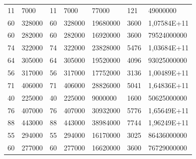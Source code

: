 \documentclass[a4paper]{scrreprt}
\begin{document}
\begin{enumerate}
\begin{table}
\begin{tiny}
\begin{tabular}{lllllll}
11                    & 7000                   & 11                  & 7000                & 77000                                       & 121                     & 49000000                \\
60                    & 328000                 & 60                  & 328000              & 19680000                                    & 3600                    & 1,07584E+11             \\
60                    & 282000                 & 60                  & 282000              & 16920000                                    & 3600                    & 79524000000             \\
74                    & 322000                 & 74                  & 322000              & 23828000                                    & 5476                    & 1,03684E+11             \\
64                    & 305000                 & 64                  & 305000              & 19520000                                    & 4096                    & 93025000000             \\
56                    & 317000                 & 56                  & 317000              & 17752000                                    & 3136                    & 1,00489E+11             \\
71                    & 406000                 & 71                  & 406000              & 28826000                                    & 5041                    & 1,64836E+11             \\
40                    & 225000                 & 40                  & 225000              & 9000000                                     & 1600                    & 50625000000             \\
76                    & 407000                 & 76                  & 407000              & 30932000                                    & 5776                    & 1,65649E+11             \\
88                    & 443000                 & 88                  & 443000              & 38984000                                    & 7744                    & 1,96249E+11             \\
55                    & 294000                 & 55                  & 294000              & 16170000                                    & 3025                    & 86436000000             \\
60                    & 277000                 & 60                  & 277000              & 16620000                                    & 3600                    & 76729000000             \\

\end{tabular}
\end{tiny}
\end{table}
\end{enumerate}
\end{document}
